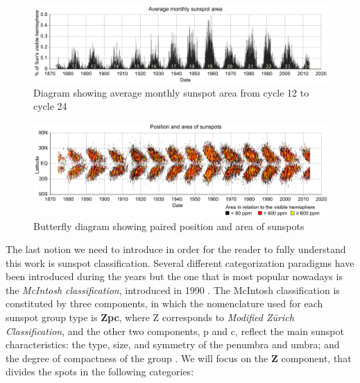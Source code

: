 \begin{figure}[t]
    \centering
    \includegraphics[width=\textwidth]{./pictures/ssarea}
    \caption{Diagram showing average monthly sunspot area from cycle 12 to cycle 24}
    \label{fig:ssarea}
\end{figure}
\begin{figure}[t]
    \centering
    \includegraphics[width=\textwidth]{./pictures/butterfly}
    \caption{Butterfly diagram showing paired position and area of sunspots}
    \label{fig:butterfly}
\end{figure}
The last notion we need to introduce in order for the reader to fully understand this work is sunspot classification. Several different categorization paradigms have been introduced during the years but the one that is most popular nowadays is the \textit{McIntosh classification}, introduced in 1990 \cite{mcintosh1990classification}. The McIntosh classification is constituted by three components, in which the nomenclature used for each sunspot group type is \textbf{Zpc}, where Z corresponds to \textit{Modified Z\"{u}rich Classification}, and the other two components, p and c, reflect the main sunspot characteristics: the type, size, and symmetry of the penumbra and umbra; and the degree of compactness of the group \cite{carrasco2015equivalence}. We will focus on the \textbf{Z} component, that divides the spots in the following categories\cite{}:
